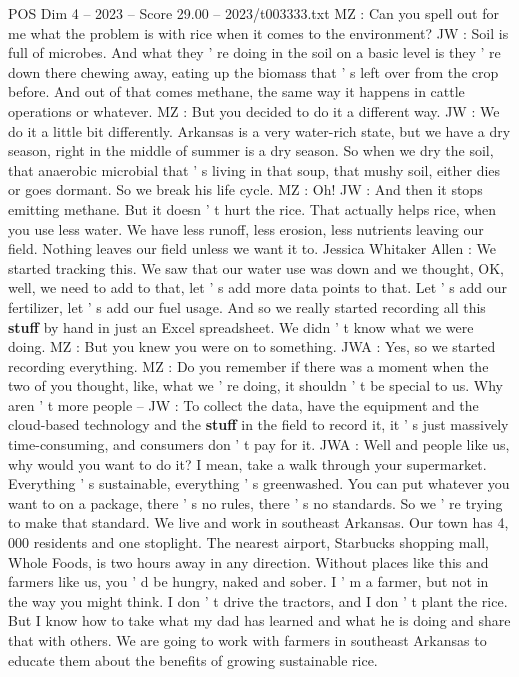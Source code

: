 \begin{textsample}{POS Dim 4 – 2023 – Score 29.00 – 2023/t003333.txt}
MZ : Can you spell out for me what the problem is with rice when it comes to the environment?
JW : Soil is full of microbes.
And what they ' re doing in the soil on a basic level is they ' re down there chewing away, eating up the biomass that ' s left over from the crop before.
And out of that comes methane, the same way it happens in cattle operations or whatever.
MZ : But you decided to do it a different way.
JW : We do it a little bit differently.
Arkansas is a very water-rich state, but we have a dry season, right in the middle of summer is a dry season.
So when we dry the soil, that anaerobic microbial that ' s living in that soup, that mushy soil, either dies or goes dormant.
So we break his life cycle.
MZ : Oh!
JW : And then it stops emitting methane.
But it doesn ' t hurt the rice.
That actually helps rice, when you use less water.
We have less runoff, less erosion, less nutrients leaving our field.
Nothing leaves our field unless we want it to.
Jessica Whitaker Allen : We started tracking this.
We saw that our water use was down and we thought, OK, well, we need to add to that, let ' s add more data points to that.
Let ' s add our fertilizer, let ' s add our fuel usage.
And so we really started recording all this \textbf{stuff} by hand in just an Excel spreadsheet.
We didn ' t know what we were doing.
MZ : But you knew you were on to something.
JWA : Yes, so we started recording everything.
MZ : Do you remember if there was a moment when the two of you thought, like, what we ' re doing, it shouldn ' t be special to us.
Why aren ' t more people -- JW : To collect the data, have the equipment and the cloud-based technology and the \textbf{stuff} in the field to record it, it ' s just massively time-consuming, and consumers don ' t pay for it.
JWA : Well and people like us, why would you want to do it?
I mean, take a walk through your supermarket.
Everything ' s sustainable, everything ' s greenwashed.
You can put whatever you want to on a package, there ' s no rules, there ' s no standards.
So we ' re trying to make that standard.
We live and work in southeast Arkansas.
Our town has 4, 000 residents and one stoplight.
The nearest airport, Starbucks shopping mall, Whole Foods, is two hours away in any direction.
Without places like this and farmers like us, you ' d be hungry, naked and sober.
I ' m a farmer, but not in the way you might think.
I don ' t drive the tractors, and I don ' t plant the rice.
But I know how to take what my dad has learned and what he is doing and share that with others.
We are going to work with farmers in southeast Arkansas to educate them about the benefits of growing sustainable rice.

\end{textsample}

